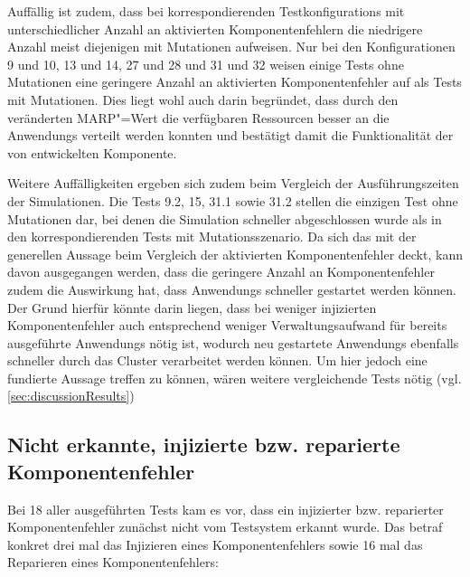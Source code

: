 Auffällig ist zudem, dass bei korrespondierenden \glspl{Testkonfiguration} mit unterschiedlicher Anzahl an aktivierten Komponentenfehlern die niedrigere Anzahl meist diejenigen mit Mutationen aufweisen.
Nur bei den Konfigurationen 9 und 10, 13 und 14, 27 und 28 und 31 und 32 weisen einige \glspl{Test} ohne Mutationen eine geringere Anzahl an aktivierten Komponentenfehler auf als \glspl{Test} mit Mutationen.
Dies liegt wohl auch darin begründet, dass durch den veränderten \gls{MARP}"=Wert die verfügbaren Ressourcen besser an die \glspl{Anwendung} verteilt werden konnten und bestätigt damit die Funktionalität der von \citeauthor{Zhang2016} entwickelten Komponente.

Weitere Auffälligkeiten ergeben sich zudem beim Vergleich der Ausführungszeiten der Simulationen.
Die \glspl{Test} 9.2, 15, 31.1 sowie 31.2 stellen die einzigen \gls{Test} ohne Mutationen dar, bei denen die Simulation schneller abgeschlossen wurde als in den korrespondierenden \glspl{Test} mit Mutationsszenario.
Da sich das mit der generellen Aussage beim Vergleich der aktivierten Komponentenfehler deckt, kann davon ausgegangen werden, dass die geringere Anzahl an Komponentenfehler zudem die Auswirkung hat, dass \glspl{Anwendung} schneller gestartet werden können.
Der Grund hierfür könnte darin liegen, dass bei weniger injizierten Komponentenfehler auch entsprechend weniger Verwaltungsaufwand für bereits ausgeführte \glspl{Anwendung} nötig ist, wodurch neu gestartete \glspl{Anwendung} ebenfalls schneller durch das Cluster verarbeitet werden können.
Um hier jedoch eine fundierte Aussage treffen zu können, wären weitere vergleichende \glspl{Test} nötig (vgl. \cref{sec:discussionResults})

\subsection{Nicht erkannte, injizierte bzw. reparierte Komponentenfehler}
\label{subsec:notDetectedFaults}

Bei 18 aller ausgeführten \glspl{Test} kam es vor, dass ein injizierter bzw. reparierter Komponentenfehler zunächst nicht vom Testsystem erkannt wurde.
Das betraf konkret drei mal das Injizieren eines Komponentenfehlers sowie 16 mal das Reparieren eines Komponentenfehlers:

